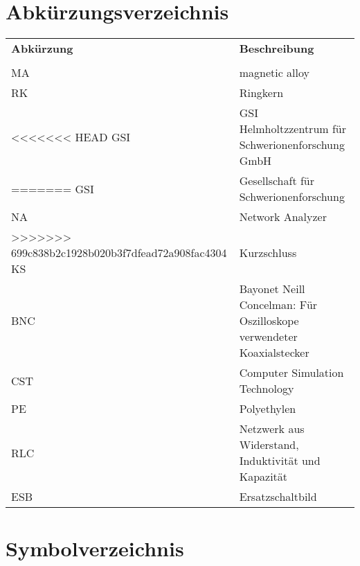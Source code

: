 \chapter*{Abk\"urzungsverzeichnis}
\begin{tabular}{p{} p{}}
\textbf{Abk\"urzung} & \textbf{Beschreibung} \\
 & \\
MA & magnetic alloy \\
RK & Ringkern \\
<<<<<<< HEAD
GSI & GSI Helmholtzzentrum f\"ur Schwerionenforschung GmbH\\
=======
GSI & Gesellschaft f\"ur Schwerionenforschung \\
NA & Network Analyzer\\
>>>>>>> 699c838b2c1928b020b3f7dfead72a908fac4304
KS & Kurzschluss \\
BNC & Bayonet Neill Concelman: F\"ur Oszilloskope verwendeter Koaxialstecker \\
CST & Computer Simulation Technology \\
PE & Polyethylen \\
RLC & Netzwerk aus Widerstand, Induktivit\"at und Kapazit\"at \\
ESB & Ersatzschaltbild\\
\end{tabular}

\cleardoublepage

\chapter*{Symbolverzeichnis}

